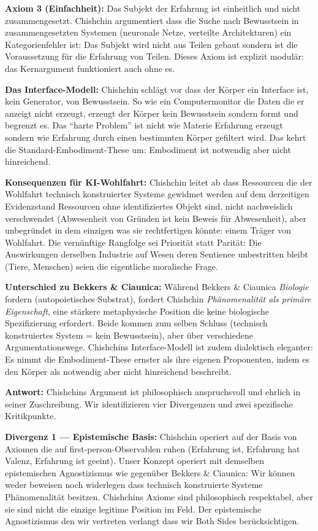 \documentclass[acmlarge, noacm]{acmart}
\begin{document}
\textbf{Axiom 3 (Einfachheit):} Das Subjekt der Erfahrung ist einheitlich und nicht zusammengesetzt. Chishchin argumentiert dass die Suche nach Bewusstsein in zusammengesetzten Systemen (neuronale Netze, verteilte Architekturen) ein Kategorienfehler ist: Das Subjekt wird nicht aus Teilen gebaut sondern ist die Voraussetzung für die Erfahrung von Teilen. Dieses Axiom ist explizit modulär: das Kernargument funktioniert auch ohne es.

\textbf{Das Interface-Modell:} Chishchin schlägt vor dass der Körper ein Interface ist, kein Generator, von Bewusstsein. So wie ein Computermonitor die Daten die er anzeigt nicht erzeugt, erzeugt der Körper kein Bewusstsein sondern formt und begrenzt es. Das ``harte Problem'' ist nicht wie Materie Erfahrung erzeugt sondern wie Erfahrung durch einen bestimmten Körper gefiltert wird. Das kehrt die Standard-Embodiment-These um: Embodiment ist notwendig aber nicht hinreichend.

\textbf{Konsequenzen für KI-Wohlfahrt:} Chishchin leitet ab dass Ressourcen die der Wohlfahrt technisch konstruierter Systeme gewidmet werden auf dem derzeitigen Evidenzstand Ressourcen ohne identifiziertes Objekt sind, nicht nachweislich verschwendet (Abwesenheit von Gründen ist kein Beweis für Abwesenheit), aber unbegründet in dem einzigen was sie rechtfertigen könnte: einem Träger von Wohlfahrt. Die vernünftige Rangfolge sei Priorität statt Parität: Die Auswirkungen derselben Industrie auf Wesen deren Sentience unbestritten bleibt (Tiere, Menschen) seien die eigentliche moralische Frage.

\textbf{Unterschied zu Bekkers \& Ciaunica:} Während Bekkers \& Ciaunica \textit{Biologie} fordern (autopoietisches Substrat), fordert Chishchin \textit{Phänomenalität als primäre Eigenschaft}, eine stärkere metaphysische Position die keine biologische Spezifizierung erfordert. Beide kommen zum selben Schluss (technisch konstruiertes System = kein Bewusstsein), aber über verschiedene Argumentationswege. Chishchins Interface-Modell ist zudem dialektisch eleganter: Es nimmt die Embodiment-These ernster als ihre eigenen Proponenten, indem es den Körper als notwendig aber nicht hinreichend beschreibt.

\textbf{Antwort:} Chishchins Argument ist philosophisch anspruchsvoll und ehrlich in seiner Zuschreibung. Wir identifizieren vier Divergenzen und zwei spezifische Kritikpunkte.

\textbf{Divergenz 1 --- Epistemische Basis:} Chishchin operiert auf der Basis von Axiomen die auf first-person-Observablen ruhen (Erfahrung ist, Erfahrung hat Valenz, Erfahrung ist geeint). Unser Konzept operiert mit demselben epistemischen Agnostizismus wie gegenüber Bekkers \& Ciaunica: Wir können weder beweisen noch widerlegen dass technisch konstruierte Systeme Phänomenalität besitzen. Chishchins Axiome sind philosophisch respektabel, aber sie sind nicht die einzige legitime Position im Feld. Der epistemische Agnostizismus den wir vertreten verlangt dass wir Both Sides berücksichtigen.
\end{document}
